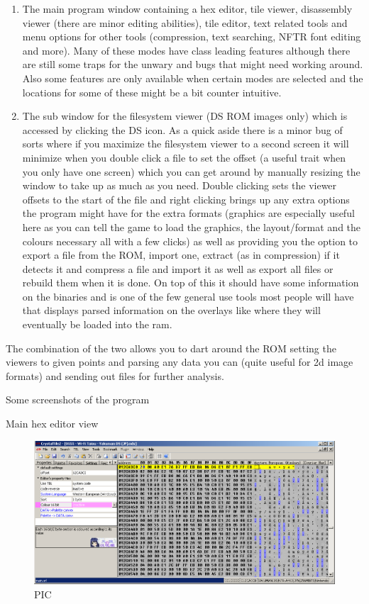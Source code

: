 \documentclass[
]{book}
\providecommand{\tightlist}{%
  \setlength{\itemsep}{0pt}\setlength{\parskip}{0pt}}
\begin{document}
\begin{enumerate}
\def\labelenumi{\arabic{enumi}.}
\tightlist
\item
  The main program window containing a hex editor, tile viewer, disassembly viewer (there are minor editing abilities), tile editor, text related tools and menu options for other tools (compression, text searching, NFTR font editing and more). Many of these modes have class leading features although there are still some traps for the unwary and bugs that might need working around. Also some features are only available when certain modes are selected and the locations for some of these might be a bit counter intuitive.
\item
  The sub window for the filesystem viewer (DS ROM images only) which is accessed by clicking the DS icon. As a quick aside there is a minor bug of sorts where if you maximize the filesystem viewer to a second screen it will minimize when you double click a file to set the offset (a useful trait when you only have one screen) which you can get around by manually resizing the window to take up as much as you need. Double clicking sets the viewer offsets to the start of the file and right clicking brings up any extra options the program might have for the extra formats (graphics are especially useful here as you can tell the game to load the graphics, the layout/format and the colours necessary all with a few clicks) as well as providing you the option to export a file from the ROM, import one, extract (as in compression) if it detects it and compress a file and import it as well as export all files or rebuild them when it is done. On top of this it should have some information on the binaries and is one of the few general use tools most people will have that displays parsed information on the overlays like where they will eventually be loaded into the ram.
\end{enumerate}

The combination of the two allows you to dart around the ROM setting the viewers to given points and parsing any data you can (quite useful for 2d image formats) and sending out files for further analysis.

Some screenshots of the program

Main hex editor view

\begin{figure}
\centering
\includegraphics{images/220_home_fast6191_romhackingguide_unrenamed_fil___inal_borders_romhackguidecrystaltile2usage1.png}
\caption{PIC}
\end{figure}
\end{document}
